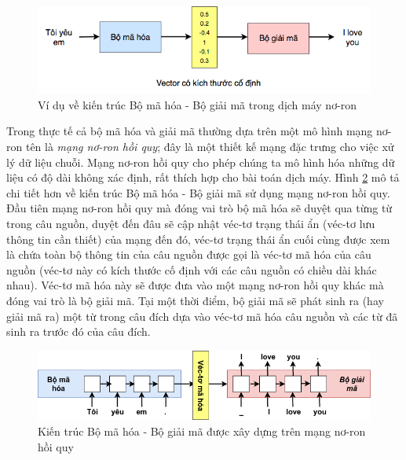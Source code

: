 \begin{figure}
	\centering
	\includegraphics[width=\textwidth]{intro2nmt}
	\caption[Ví dụ về Kiến trúc \textit{Bộ mã hóa - Bộ giải mã} trong dịch máy nơ-ron]{Ví dụ về kiến trúc Bộ mã hóa - Bộ giải mã trong dịch máy nơ-ron}
	\label{fig_encoder_decoder}
\end{figure}

Trong thực tế cả bộ mã hóa và giải mã thường dựa trên một mô hình mạng nơ-ron tên là \textit{mạng nơ-ron hồi quy}; đây là một thiết kế mạng đặc trưng cho việc xử lý dữ liệu chuỗi. Mạng nơ-ron hồi quy cho phép chúng ta mô hình hóa những dữ liệu có độ dài không xác định, rất thích hợp cho bài toán dịch máy. Hình \ref{fig_encoder_decoder_details} mô tả chi tiết hơn về kiến trúc Bộ mã hóa - Bộ giải mã sử dụng mạng nơ-ron hồi quy. Đầu tiên mạng nơ-ron hồi quy mà đóng vai trò bộ mã hóa sẽ duyệt qua từng từ trong câu nguồn, duyệt đến đâu sẽ cập nhật véc-tơ trạng thái ẩn (véc-tơ lưu thông tin cần thiết) của mạng đến đó, véc-tơ trạng thái ẩn cuối cùng được xem là chứa toàn bộ thông tin của câu nguồn được gọi là véc-tơ mã hóa của câu nguồn (véc-tơ này có kích thước cố định với các câu nguồn có chiều dài khác nhau). Véc-tơ mã hóa này sẽ được đưa vào một mạng nơ-ron hồi quy khác mà đóng vai trò là bộ giải mã. Tại một thời điểm, bộ giải mã sẽ phát sinh ra (hay giải mã ra) một từ trong câu đích dựa vào véc-tơ mã hóa câu nguồn và các từ đã sinh ra trước đó của câu đích.
\begin{figure}
	\centering
	\includegraphics[width=\textwidth]{encoder-decoder}
	\caption[Kiến trúc Bộ mã hóa - Bộ giải mã được xây dựng trên mạng nơ-ron hồi quy]{Kiến trúc Bộ mã hóa - Bộ giải mã được xây dựng trên mạng nơ-ron hồi quy}
	\label{fig_encoder_decoder_details}
\end{figure}

